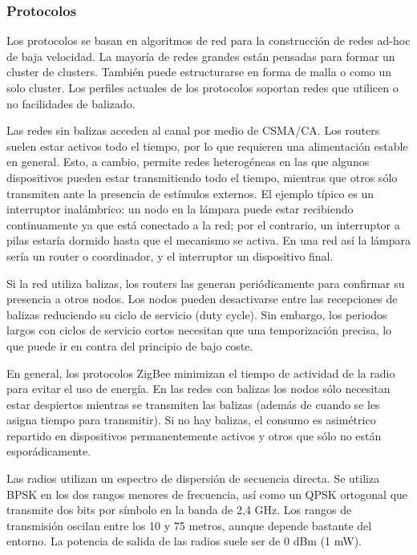 \subsubsection{Protocolos}
Los protocolos se basan en algoritmos de red para la construcci\'on de redes ad-hoc de baja velocidad. La mayor\'ia de redes grandes est\'an pensadas para formar un cluster de clusters. Tambi\'en puede estructurarse en forma de malla o como un solo cluster. Los perfiles actuales de los protocolos soportan redes que utilicen o no facilidades de balizado.

Las redes sin balizas acceden al canal por medio de CSMA/CA. Los routers suelen estar activos todo el tiempo, por lo que requieren una alimentaci\'on estable en general. Esto, a cambio, permite redes heterog\'eneas en las que algunos dispositivos pueden estar transmitiendo todo el tiempo, mientras que otros s\'olo transmiten ante la presencia de est\'imulos externos. El ejemplo t\'ipico es un interruptor inal\'ambrico: un nodo en la l\'ampara puede estar recibiendo continuamente ya que est\'a conectado a la red; por el contrario, un interruptor a pilas estar\'ia dormido hasta que el mecanismo se activa. En una red as\'i la l\'ampara ser\'ia un router o coordinador, y el interruptor un dispositivo final.

Si la red utiliza balizas, los routers las generan peri\'odicamente para confirmar su presencia a otros nodos. Los nodos pueden desactivarse entre las recepciones de balizas reduciendo su ciclo de servicio (duty cycle). Sin embargo, los periodos largos con ciclos de servicio cortos necesitan que una temporizaci\'on precisa, lo que puede ir en contra del principio de bajo coste.

En general, los protocolos ZigBee minimizan el tiempo de actividad de la radio para evitar el uso de energ\'ia. En las redes con balizas los nodos s\'olo necesitan estar despiertos mientras se transmiten las balizas (adem\'as de cuando se les asigna tiempo para transmitir). Si no hay balizas, el consumo es asim\'etrico repartido en dispositivos permanentemente activos y otros que s\'olo no est\'an espor\'adicamente.

Las radios utilizan un espectro de dispersi\'on de secuencia directa. Se utiliza BPSK en los dos rangos menores de frecuencia, as\'i como un QPSK ortogonal que transmite dos bits por s\'imbolo en la banda de 2,4 GHz. Los rangos de transmisi\'on oscilan entre los 10 y 75 metros, aunque depende bastante del entorno. La potencia de salida de las radios suele ser de 0 dBm (1 mW).

